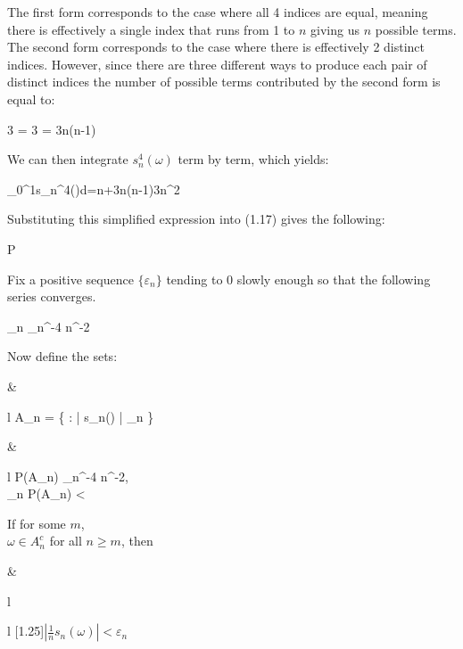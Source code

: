 \begin{proofline}
	The first form corresponds to the case where all 4 indices are equal, meaning there is effectively a single index that runs from 1 to $n$ giving us $n$ possible terms. The second form corresponds to the case where there is effectively 2 distinct indices. However, since there are three different ways to produce each pair of distinct indices the number of possible terms contributed by the second form is equal to: 
	\begin{UNequation}
		3\cdot {} = 3 \cdot {} = 3n(n-1)
	\end{UNequation}
	
	
	We can then integrate $s_n^4(\omega)$ term by term, which yields:
	\begin{UNequation}
		\int_0^1s_n^4(\omega)d\omega=n+3n(n-1)\leq 3n^2
	\end{UNequation}
	Substituting this simplified expression into (1.17) gives the following:
	\begin{UNequation}
		P \leq \frac{3}{n^2\varepsilon^4}
	\end{UNequation}
	Fix a positive sequence $\{\varepsilon_n\}$ tending to $0$ slowly enough so that the following series converges.
	\begin{UNequation}
		\sum_n \varepsilon_n^{-4} n^{-2}
	\end{UNequation}
	
	\vspace{-5ex}
	
	Now define the sets:
	\begin{UNequation}
		\begin{aligned}
			  & \begin{array}{l} 
			A_n = \left\{ \omega : \left|  s_n(\omega) \right| \geq \varepsilon_n \right\}
			\end{array}
			\quad \& \quad
			\begin{array}{l}
			P(A_n)  \varepsilon_n^{-4} n^{-2},\\
			\sum_n P(A_n) < \infty
			\end{array}
		\end{aligned}
	\end{UNequation}
	
	
	If for some $m$,\\
	$\omega \in A_n^c$ for all $n \geq m$, then
	\vspace{-7ex}
	\begin{UNequation}
		\hspace{4cm}
		\begin{aligned}
			  & \begin{array}{l} 
			\hspace{4cm}
			\end{array}
			\quad
			\begin{array}{l}
			\scalebox{1.25}[1.25]{$\left| \frac{1}{n} s_n(\omega) \right| < \varepsilon_n$} \quad \text{{\footnotesize for all $n \geq m$}}
			\end{array}
		\end{aligned}
	\end{UNequation}
	

\end{proofline}
